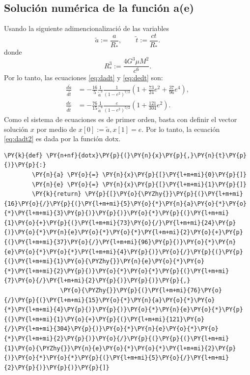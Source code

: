 \subsection{Solución numérica de la función a(e)}
Usando la siguiente adimencionalizació de las variables
\begin{equation*}
    \tilde{a}:= \frac{a}{R_*}, \qquad  \tilde{t}:=\frac{ct}{R_*}.
\end{equation*}
donde
\begin{equation*}
    R_*^3 := \frac{4G^3\mu M^2}{c^6}.
\end{equation*}
Por lo tanto, las ecuaciones \ref{eq:dadt} y \ref{eq:dedt} son:
\begin{align}
    \label{eq:dadt2}
    \frac{d\tilde{a}}{d\tilde{t}} &= -\frac{16}{5}\frac{1}{\tilde{a}^3}\frac{1}{\left(1-e^2\right)^{7/2}}\left(1+\frac{73}{24}e^2+\frac{37}{96}e^4\right) ,\\
    \label{eq:dedt2}
\frac{de}{d\tilde{t}} &= -\frac{76}{15}\frac{1}{\tilde{a}^4}\frac{e}{\left(1-e^2\right)^{5/2}}\left(1+\frac{121}{304}e^2\right) .
\end{align}
Como el sistema de ecuaciones es de primer orden, basta con definir el vector solución $x$ por medio de $x[0]:=\tilde{a}, x[1]=e$. Por lo tanto, 
la ecuación \ref{eq:dadt2} es dada por la función \textcolor{def}{dotx}.
\begin{tcolorbox}[breakable, size=fbox, boxrule=1pt, pad at break*=1mm,colback=cellbackground, colframe=cellborder]
    \begin{Verbatim}[commandchars=\\\{\}]
    \PY{k}{def} \PY{n+nf}{dotx}\PY{p}{(}\PY{n}{x}\PY{p}{,}\PY{n}{t}\PY{p}{)}\PY{p}{:}
        \PY{n}{a} \PY{o}{=} \PY{n}{x}\PY{p}{[}\PY{l+m+mi}{0}\PY{p}{]}
        \PY{n}{e} \PY{o}{=} \PY{n}{x}\PY{p}{[}\PY{l+m+mi}{1}\PY{p}{]}
        \PY{k}{return} \PY{p}{[}\PY{o}{\PYZhy{}}\PY{p}{(}\PY{l+m+mi}{16}\PY{o}{/}\PY{p}{(}\PY{l+m+mi}{5}\PY{o}{*}\PY{n}{a}\PY{o}{*}\PY{o}{*}\PY{l+m+mi}{3}\PY{p}{)}\PY{p}{)}\PY{o}{*}\PY{p}{(}\PY{l+m+mi}{1}\PY{o}{+}\PY{p}{(}\PY{l+m+mi}{73}\PY{o}{/}\PY{l+m+mi}{24}\PY{p}{)}\PY{o}{*}\PY{n}{e}\PY{o}{*}\PY{o}{*}\PY{l+m+mi}{2}\PY{o}{+}\PY{p}{(}\PY{l+m+mi}{37}\PY{o}{/}\PY{l+m+mi}{96}\PY{p}{)}\PY{o}{*}\PY{n}{e}\PY{o}{*}\PY{o}{*}\PY{l+m+mi}{4}\PY{p}{)}\PY{o}{/}\PY{p}{(}\PY{p}{(}\PY{l+m+mi}{1}\PY{o}{\PYZhy{}}\PY{n}{e}\PY{o}{*}\PY{o}{*}\PY{l+m+mi}{2}\PY{p}{)}\PY{o}{*}\PY{o}{*}\PY{p}{(}\PY{l+m+mi}{7}\PY{o}{/}\PY{l+m+mi}{2}\PY{p}{)}\PY{p}{)}\PY{p}{,}
                \PY{o}{\PYZhy{}}\PY{p}{(}\PY{l+m+mi}{76}\PY{o}{/}\PY{p}{(}\PY{l+m+mi}{15}\PY{o}{*}\PY{n}{a}\PY{o}{*}\PY{o}{*}\PY{l+m+mi}{4}\PY{p}{)}\PY{p}{)}\PY{o}{*}\PY{n}{e}\PY{o}{*}\PY{p}{(}\PY{l+m+mi}{1}\PY{o}{+}\PY{p}{(}\PY{l+m+mi}{121}\PY{o}{/}\PY{l+m+mi}{304}\PY{p}{)}\PY{o}{*}\PY{n}{e}\PY{o}{*}\PY{o}{*}\PY{l+m+mi}{2}\PY{p}{)}\PY{o}{/}\PY{p}{(}\PY{p}{(}\PY{l+m+mi}{1}\PY{o}{\PYZhy{}}\PY{n}{e}\PY{o}{*}\PY{o}{*}\PY{l+m+mi}{2}\PY{p}{)}\PY{o}{*}\PY{o}{*}\PY{p}{(}\PY{l+m+mi}{5}\PY{o}{/}\PY{l+m+mi}{2}\PY{p}{)}\PY{p}{)}\PY{p}{]}
    \end{Verbatim}
    \end{tcolorbox}
